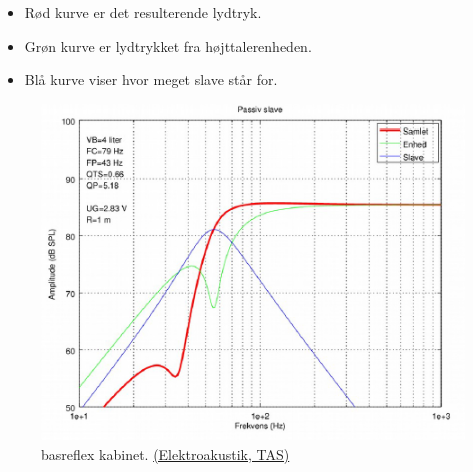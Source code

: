 \begin{itemize}
	\item Rød kurve er det resulterende lydtryk.
	\item Grøn kurve er	lydtrykket fra højttalerenheden.
	\item Blå kurve viser hvor meget slave står for.
\end{itemize}

\begin{figure} [H]
	\centering
	\includegraphics[width=0.75\linewidth]{graphics/61.png}
	\caption{basreflex kabinet. \href{http://www.torean.dk/artikel/Elektroakustik.pdf}{(Elektroakustik, TAS)}}
	\label{fig:61}
\end{figure}
